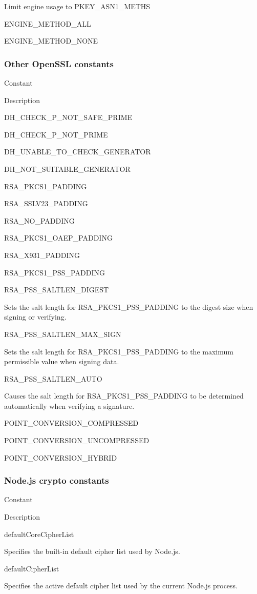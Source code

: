 Limit engine usage to PKEY\_ASN1\_METHS

ENGINE\_METHOD\_ALL

ENGINE\_METHOD\_NONE

\subsubsection{Other OpenSSL constants}\label{other-openssl-constants}

Constant

Description

DH\_CHECK\_P\_NOT\_SAFE\_PRIME

DH\_CHECK\_P\_NOT\_PRIME

DH\_UNABLE\_TO\_CHECK\_GENERATOR

DH\_NOT\_SUITABLE\_GENERATOR

RSA\_PKCS1\_PADDING

RSA\_SSLV23\_PADDING

RSA\_NO\_PADDING

RSA\_PKCS1\_OAEP\_PADDING

RSA\_X931\_PADDING

RSA\_PKCS1\_PSS\_PADDING

RSA\_PSS\_SALTLEN\_DIGEST

Sets the salt length for RSA\_PKCS1\_PSS\_PADDING to the digest size
when signing or verifying.

RSA\_PSS\_SALTLEN\_MAX\_SIGN

Sets the salt length for RSA\_PKCS1\_PSS\_PADDING to the maximum
permissible value when signing data.

RSA\_PSS\_SALTLEN\_AUTO

Causes the salt length for RSA\_PKCS1\_PSS\_PADDING to be determined
automatically when verifying a signature.

POINT\_CONVERSION\_COMPRESSED

POINT\_CONVERSION\_UNCOMPRESSED

POINT\_CONVERSION\_HYBRID

\subsubsection{Node.js crypto constants}\label{node.js-crypto-constants}

Constant

Description

defaultCoreCipherList

Specifies the built-in default cipher list used by Node.js.

defaultCipherList

Specifies the active default cipher list used by the current Node.js
process.
